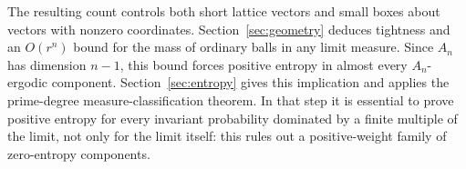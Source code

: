\documentclass[11pt]{article}
\theoremstyle{remark}
\numberwithin{equation}{section}
\begin{document}
The resulting count controls both short lattice vectors and small
boxes about vectors with nonzero coordinates. Section~\ref{sec:geometry}
deduces tightness and an $O(r^n)$ bound for the mass of ordinary balls
in any limit measure. Since $A_n$ has dimension $n-1$, this bound
forces positive entropy in almost every $A_n$-ergodic component.
Section~\ref{sec:entropy} gives this implication and applies the
prime-degree measure-classification theorem. In that step it is
essential to prove positive entropy for every invariant probability
dominated by a finite multiple of the limit, not only for the limit
itself: this rules out a positive-weight family of zero-entropy
components.







\appendix


{\small


}
\end{document}
